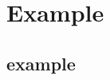 \documentclass[compress]{beamer}
\begin{document}
\begin{frame}[fragile]
\begin{columns}
\begin{column}{0.4\textwidth}
    \end{column}
  \end{columns}
\end{frame}



\section{Example}

\subsection{example}
\end{document}
